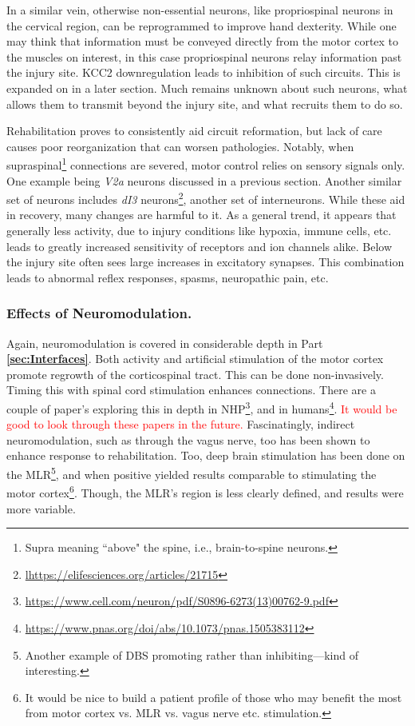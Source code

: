 \documentclass[12pt]{report}
\begin{document}
In a similar vein, otherwise non-essential neurons, like propriospinal neurons in the cervical region, can be reprogrammed to improve hand dexterity. While one may think that information must be conveyed directly from the motor cortex to the muscles on interest, in this case propriospinal neurons relay information past the injury site. KCC2 downregulation leads to inhibition of such circuits. This is expanded on in a later section. Much remains unknown about such neurons, what allows them to transmit beyond the injury site, and what recruits them to do so.\newline

Rehabilitation proves to consistently aid circuit reformation, but lack of care causes poor reorganization that can worsen pathologies. Notably, when supraspinal\footnote{Supra meaning ``above" the spine, i.e., brain-to-spine neurons.} connections are severed, motor control relies on sensory signals only. One example being \textit{V2a} neurons discussed in a previous section. Another similar set of neurons includes \textit{dI3} neurons\footnote{\url{lhttps://elifesciences.org/articles/21715}}, another set of interneurons. While these aid in recovery, many changes are harmful to it. As a general trend, it appears that generally less activity, due to injury conditions like hypoxia, immune cells, etc. leads to greatly increased sensitivity of receptors and ion channels alike. Below the injury site often sees large increases in excitatory synapses. This combination leads to abnormal reflex responses, spasms, neuropathic pain, etc. 

\subsubsection{Effects of Neuromodulation.}

Again, neuromodulation is covered in considerable depth in Part \textbf{\ref{sec:Interfaces}}. Both activity and artificial stimulation of the motor cortex promote regrowth of the corticospinal tract. This can be done non-invasively. Timing this with spinal cord stimulation enhances connections. There are a couple of paper's exploring this in depth in NHP\footnote{\url{https://www.cell.com/neuron/pdf/S0896-6273(13)00762-9.pdf}}, and in humans\footnote{\url{https://www.pnas.org/doi/abs/10.1073/pnas.1505383112}}. \textcolor{red}{It would be good to look through these papers in the future.} Fascinatingly, indirect neuromodulation, such as through the vagus nerve, too has been shown to enhance response to rehabilitation. Too, deep brain stimulation has been done on the MLR\footnote{Another example of DBS promoting rather than inhibiting---kind of interesting.}, and when positive yielded results comparable to stimulating the motor cortex\footnote{It would be nice to build a patient profile of those who may benefit the most from motor cortex vs. MLR vs. vagus nerve etc. stimulation.}. Though, the MLR's region is less clearly defined, and results were more variable.\newline
\end{document}
